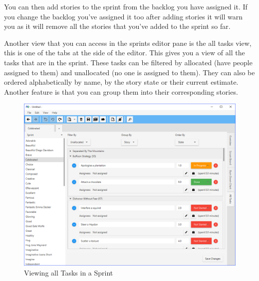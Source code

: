 You can then add stories to the sprint from the backlog you have assigned it. If you change the backlog you've assigned it too after adding stories it will warn you as it will remove all the stories that you've added to the sprint so far.

Another view that you can access in the sprints editor pane is the all tasks view, this is one of the tabs at the side of the editor. This gives you a view of all the tasks that are in the sprint. These tasks can be filtered by allocated (have people assigned to them) and unallocated (no one is assigned to them). They can also be ordered alphabetically by name, by the story state or their current estimate. Another feature is that you can group them into their corresponding stories.

\begin{figure}[H]
\centering
\includegraphics[width=\textwidth]{images/screenshots/sprint2.PNG}
\caption{Viewing all Tasks in a Sprint}
\label{fig:new_project}
\end{figure}